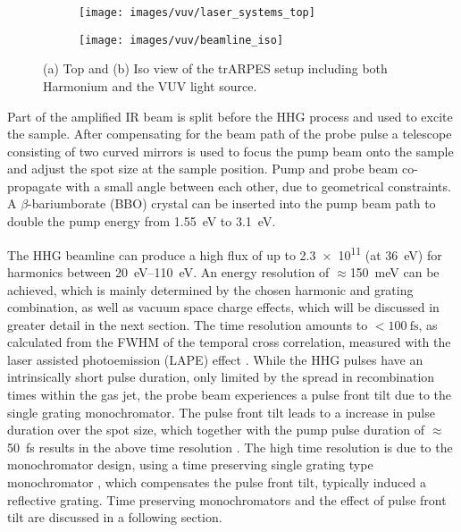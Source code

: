 \begin{figure}
	\centering
	\begin{subfigure}[b]{0.45\textwidth}
		\texttt{[image: images/vuv/laser\_systems\_top]}
		\caption{}
	\end{subfigure}
	\begin{subfigure}[b]{0.45\textwidth}
		\texttt{[image: images/vuv/beamline\_iso]}
		\caption{}
	\end{subfigure}
	\caption{(a) Top and (b) Iso view of the trARPES setup including both Harmonium and the VUV light source.}
	\label{fig:beamline_cad}
\end{figure}


Part of the amplified IR beam is split before the HHG process and used to excite the sample.
After compensating for the beam path of the probe pulse a telescope consisting of two curved mirrors is used to focus the pump beam onto the sample and adjust the spot size at the sample position.
Pump and probe beam co-propagate with a small angle between each other, due to geometrical constraints.
A $\beta$-bariumborate (BBO) crystal can be inserted into the pump beam path to double the pump energy from \qty{1.55}{\electronvolt} to \qty{3.1}{\electronvolt}.

The HHG beamline can produce a high flux of up to \qty{2.3e11}{\pps} (at \qty{36}{\electronvolt}) for harmonics between \qtyrange{20}{110}{\electronvolt}.
An energy resolution of $\approx$\qty{150}{\milli\electronvolt} can be achieved, which is mainly determined by the chosen harmonic and grating combination, as well as vacuum space charge effects, which will be discussed in greater detail in the next section.
The time resolution amounts to $<\qty{100}{\femto\second}$, as calculated from the FWHM of the temporal cross correlation, measured with the laser assisted photoemission (LAPE) effect \cite{ojeda_harmonium_2015}.
While the HHG pulses have an intrinsically short pulse duration, only limited by the spread in recombination times within the gas jet, the probe beam experiences a pulse front tilt due to the single grating monochromator.
The pulse front tilt leads to a increase in pulse duration over the spot size, which together with the pump pulse duration of $\approx$\qty{50}{\femto\second} results in the above time resolution \cite{arrell_harmonium_2017}.
The high time resolution is due to the monochromator design, using a time preserving single grating type monochromator \cite{poletto_time-preserving_2010}, which compensates the pulse front tilt, typically induced a reflective grating.
Time preserving monochromators and the effect of pulse front tilt are discussed in a following section.

